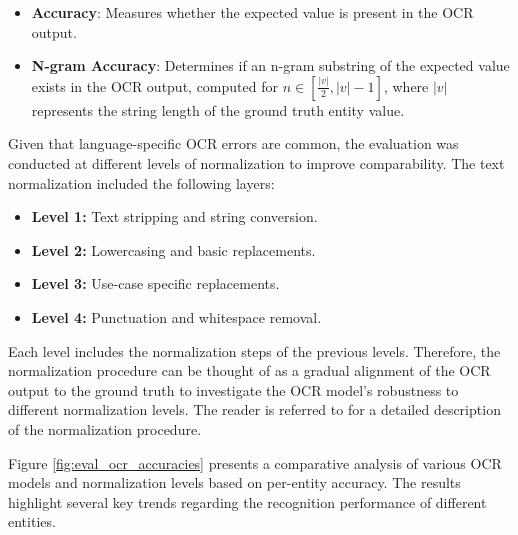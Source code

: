 \documentclass[11pt]{article}
\begin{document}
\begin{itemize}
    \item \textbf{Accuracy}: Measures whether the expected value is present in the OCR output.
    \item \textbf{N-gram Accuracy}: Determines if an n-gram substring of the expected value exists in the OCR output, computed for $n \in \left[\frac{|v|}{2}, |v| - 1\right]$, where $|v|$ represents the string length of the ground truth entity value.
\end{itemize}

Given that language-specific OCR errors are common, the evaluation was conducted at different levels of normalization to improve comparability. The text normalization included the following layers:
\begin{itemize}
    \item \textbf{Level 1:} Text stripping and string conversion.
    \item \textbf{Level 2:} Lowercasing and basic replacements.
    \item \textbf{Level 3:} Use-case specific replacements.
    \item \textbf{Level 4:} Punctuation and whitespace removal.
\end{itemize}
Each level includes the normalization steps of the previous levels. Therefore, the normalization procedure can be thought of as a gradual alignment of the OCR output to the ground truth to investigate the OCR model's robustness to different normalization levels. The reader is referred to  for a detailed description of the normalization procedure.


 Figure \ref{fig:eval_ocr_accuracies} presents a comparative analysis of various OCR models and normalization levels based on per-entity accuracy. The results highlight several key trends regarding the recognition performance of different entities.
\end{document}
